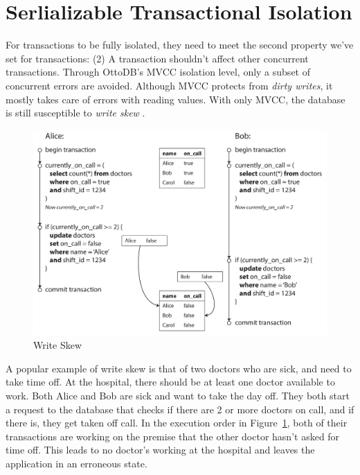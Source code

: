 \documentclass[conference]{IEEEtran}
\begin{document}
    \section{Serlializable Transactional Isolation}

    For transactions to be fully isolated, they need to meet the second property we've set for transactions: (2) A transaction shouldn't affect other concurrent transactions. Through OttoDB's MVCC isolation level, only a subset of concurrent errors are avoided. Although MVCC protects from \textit{dirty writes}, it mostly takes care of errors with reading values. With only MVCC, the database is still susceptible to \textit{write skew} \cite[p. 246]{b18}.

    \begin{figure}[h]
        \centering
        \includegraphics[width=\columnwidth]{figures/WriteSkew.png}
        \caption{Write Skew \cite[p. 247]{b18}}
        \label{fig:WriteSkew}
        \end{figure}

    A popular example of write skew is that of two doctors who are sick, and need to take time off. At the hospital, there should be at least one doctor available to work. Both Alice and Bob are sick and want to take the day off. They both start a request to the database that checks if there are 2 or more doctors on call, and if there is, they get taken off call. In the execution order in Figure~\ref{fig:WriteSkew}, both of their transactions are working on the premise that the other doctor hasn't asked for time off. This leads to no doctor's working at the hospital and leaves the application in an erroneous state. 
    
\end{document}
